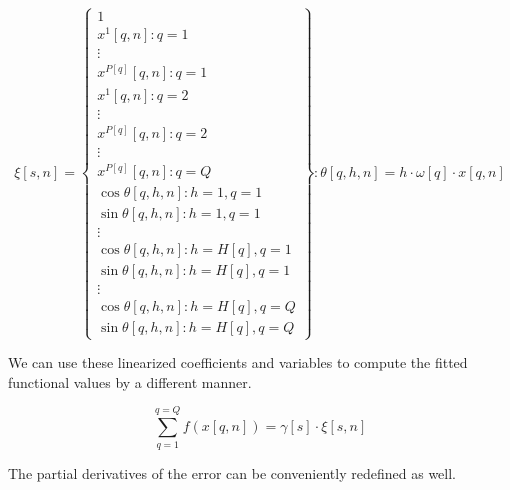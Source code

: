 \documentclass{article}
\begin{document}
\begin{equation}
\label{eqn:twodimensionalvariables}
\xi\left[s, n\right] = \left\{\begin{array}{c}
	1\\
	x^1\left[q, n\right] : q = 1\\
	\vdots\\
	x^{P\left[q\right]}\left[q, n\right] : q = 1\\
	x^1\left[q, n\right] : q = 2\\
	\vdots\\
	x^{P\left[q\right]}\left[q, n\right] : q = 2\\
	\vdots\\
	x^{P\left[q\right]}\left[q, n\right] : q = Q\\
	\cos\theta\left[q, h, n\right] : h = 1, q = 1\\
	\sin\theta\left[q, h, n\right] : h = 1, q = 1\\
	\vdots\\
	\cos\theta\left[q, h, n\right] : h = H\left[q\right], q = 1\\
	\sin\theta\left[q, h, n\right] : h = H\left[q\right], q = 1\\
	\vdots\\
	\cos\theta\left[q, h, n\right] : h = H\left[q\right], q = Q\\
	\sin\theta\left[q, h, n\right] : h = H\left[q\right], q = Q
\end{array}\right\} : \theta\left[q, h, n\right] = h \cdot \omega\left[q\right] \cdot x\left[q, n\right]
\end{equation}

\par{We can use these linearized coefficients and variables to compute the fitted functional values by a different manner.}

\begin{equation}
\sum\limits_{q = 1}^{q = Q}f\left(x\left[q, n\right]\right) = \gamma\left[s\right] \cdot \xi\left[s, n\right]
\end{equation}

\par{The partial derivatives of the error can be conveniently redefined as well.}
\end{document}
